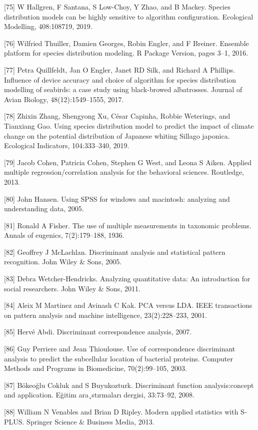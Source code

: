 \documentclass[preprint,12pt]{elsarticle}
\begin{document}
[75] W Hallgren, F Santana, S Low-Choy, Y Zhao, and B Mackey. Species distribution models can be highly sensitive to algorithm configuration. Ecological Modelling, 408:108719, 2019. 

[76] Wilfried Thuiller, Damien Georges, Robin Engler, and F Breiner. Ensemble platform for species distribution modeling. R Package Version, pages 3–1, 2016. 

[77] Petra Quillfeldt, Jan O Engler, Janet RD Silk, and Richard A Phillips. Influence of device accuracy and choice of algorithm for species distribution modelling of seabirds: a case study using black-browed albatrosses. Journal of Avian Biology, 48(12):1549–1555, 2017. 

[78] Zhixin Zhang, Shengyong Xu, César Capinha, Robbie Weterings, and Tianxiang Gao. Using species distribution model to predict the impact of climate change on the potential distribution of Japanese whiting Sillago japonica. Ecological Indicators, 104:333–340, 2019. 

[79] Jacob Cohen, Patricia Cohen, Stephen G West, and Leona S Aiken. Applied multiple regression/correlation analysis for the behavioral sciences. Routledge, 2013. 

[80] John Hansen. Using SPSS for windows and macintosh: analyzing and understanding data, 2005. 

[81] Ronald A Fisher. The use of multiple measurements in taxonomic problems. Annals of eugenics, 7(2):179–188, 1936. 

[82] Geoffrey J McLachlan. Discriminant analysis and statistical pattern recognition. John Wiley & Sons, 2005. 

[83] Debra Wetcher-Hendricks. Analyzing quantitative data: An introduction for social researchers. John Wiley & Sons, 2011. 

[84] Aleix M Martinez and Avinash C Kak. PCA versus LDA. IEEE transactions on pattern analysis and machine intelligence, 23(2):228–233, 2001. 

[85] Hervé Abdi. Discriminant correspondence analysis, 2007. 

[86] Guy Perriere and Jean Thioulouse. Use of correspondence discriminant analysis to predict the subcellular location of bacterial proteins. Computer Methods and Programs in Biomedicine, 70(2):99–105, 2003. 

[87] Bökeoğlu Cokluk and S Buyukozturk. Discriminant function analysis:concept and application. Eğitim ara¸stırmaları dergisi, 33:73–92, 2008. 

[88] William N Venables and Brian D Ripley. Modern applied statistics with S-PLUS. Springer Science & Business Media, 2013. 
\end{document}
